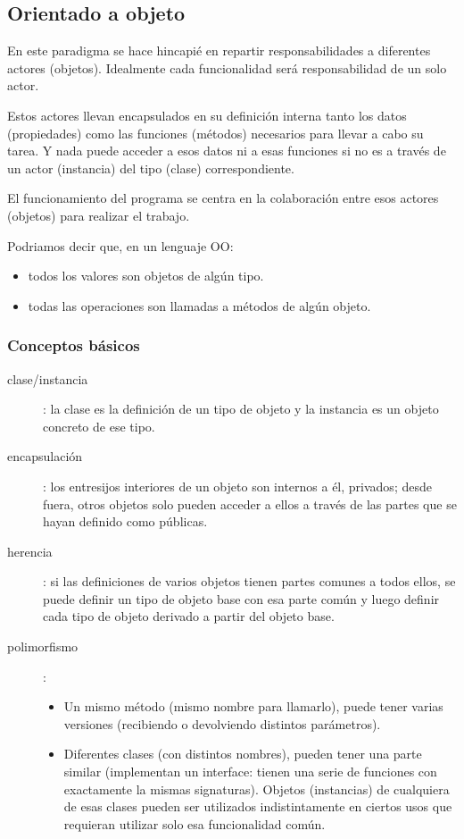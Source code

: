 \documentclass[spanish,12pt,a4paper,final,oneside]{book}
\begin{document}
\subsection{Orientado a objeto}
En este paradigma se hace hincapié en repartir responsabilidades a diferentes actores (objetos). Idealmente cada funcionalidad será responsabilidad de un solo actor.

Estos actores llevan encapsulados en su definición interna tanto los datos (propiedades) como las funciones (métodos) necesarios para llevar a cabo su tarea. Y nada puede acceder a esos datos ni a esas funciones si no es a través de un actor (instancia) del tipo (clase) correspondiente. 

El funcionamiento del programa se centra en la colaboración entre esos actores (objetos) para realizar el trabajo.

Podriamos decir que, en un lenguaje OO:
\begin{itemize}
\item todos los valores son objetos de algún tipo.
\item todas las operaciones son llamadas a métodos de algún objeto.
\end{itemize}

\subsubsection*{Conceptos básicos}
\begin{description}
\item[clase/instancia]: la clase es la definición de un tipo de objeto y la instancia es un objeto concreto de ese tipo.
\item[encapsulación]: los entresijos interiores de un objeto son internos a él, privados; desde fuera, otros objetos solo pueden acceder a ellos a través de las partes que se hayan definido como públicas.
\item[herencia]: si las definiciones de varios objetos tienen partes comunes a todos ellos, se puede definir un tipo de objeto base con esa parte común y luego definir cada tipo de objeto derivado a partir del objeto base.
\item[polimorfismo]:
\begin{itemize}
\item Un mismo método (mismo nombre para llamarlo), puede tener varias versiones (recibiendo o devolviendo distintos parámetros). 
\item Diferentes clases (con distintos nombres), pueden tener una parte similar (implementan un interface: tienen una serie de funciones con exactamente la mismas signaturas).  Objetos (instancias) de cualquiera de esas clases pueden ser utilizados indistintamente en ciertos usos que requieran utilizar solo esa funcionalidad común.
\end{itemize}
\end{description}
\end{document}
